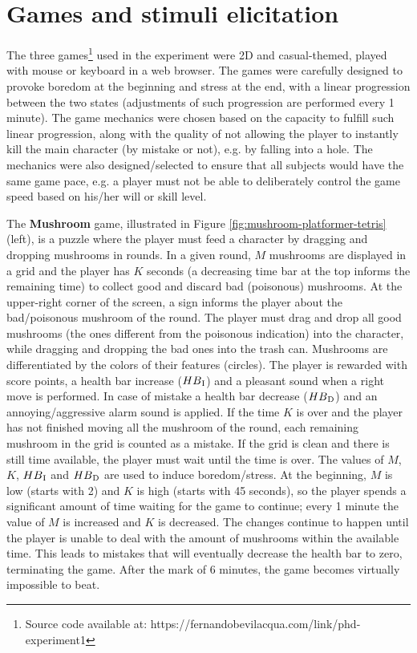\section{Games and stimuli elicitation}
\label{sec:experiment1-games-elicitation}

The three games\footnote{Source code available at: https://fernandobevilacqua.com/link/phd-experiment1} used in the experiment were 2D and casual-themed, played with mouse or keyboard in a web browser. The games were carefully designed to provoke boredom at the beginning and stress at the end, with a linear progression between the two states (adjustments of such progression are performed every 1 minute). The game mechanics were chosen based on the capacity to fulfill such linear progression, along with the quality of not allowing the player to instantly kill the main character (by mistake or not), e.g. by falling into a hole. The mechanics were also designed/selected to ensure that all subjects would have the same game pace, e.g. a player must not be able to deliberately control the game speed based on his/her will or skill level.

The \textbf{Mushroom} game, illustrated in Figure \ref{fig:mushroom-platformer-tetris} (left), is a puzzle where the player must feed a character by dragging and dropping mushrooms in rounds. In a given round, $M$ mushrooms are displayed in a grid and the player has $K$ seconds (a decreasing time bar at the top informs the remaining time) to collect good and discard bad (poisonous) mushrooms. At the upper-right corner of the screen, a sign informs the player about the bad/poisonous mushroom of the round. The player must drag and drop all good mushrooms (the ones different from the poisonous indication) into the character, while dragging and dropping the bad ones into the trash can. Mushrooms are differentiated by the colors of their features (circles). The player is rewarded with score points, a health bar increase ($HB\textsubscript{I}$) and a pleasant sound when a right move is performed. In case of mistake a health bar decrease ($HB\textsubscript{D}$) and an annoying/aggressive alarm sound is applied. If the time $K$ is over and the player has not finished moving all the mushroom of the round, each remaining mushroom in the grid is counted as a mistake. If the grid is clean and there is still time available, the player must wait until the time is over. The values of $M$, $K$, $HB\textsubscript{I}$ and $HB\textsubscript{D}$ are used to induce boredom/stress. At the beginning, $M$ is low (starts with 2) and $K$ is high (starts with 45 seconds), so the player spends a significant amount of time waiting for the game to continue; every 1 minute the value of $M$ is increased and $K$ is decreased. The changes continue to happen until the player is unable to deal with the amount of mushrooms within the available time. This leads to mistakes that will eventually decrease the health bar to zero, terminating the game. After the mark of 6 minutes, the game becomes virtually impossible to beat.

